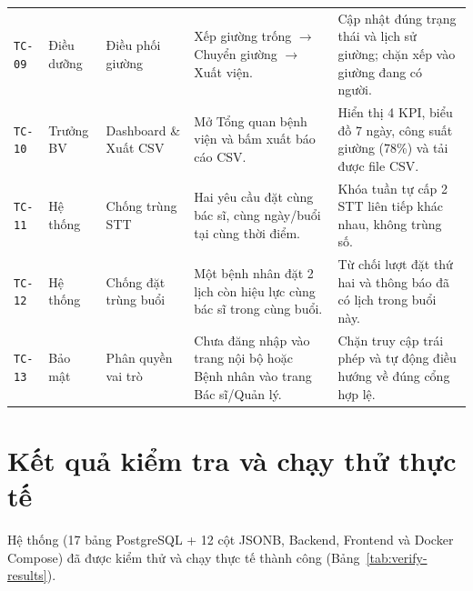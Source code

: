 \documentclass[12pt,a4paper]{report}
\begin{document}
\begin{longtable}{@{}p{1.45cm} p{2.05cm} p{2.85cm} p{3.95cm} p{3.95cm}@{}}
  \texttt{TC-09} & Điều dưỡng & Điều phối giường & Xếp giường trống $\rightarrow$ Chuyển giường $\rightarrow$ Xuất viện. & Cập nhật đúng trạng thái và lịch sử giường; chặn xếp vào giường đang có người. \\
  \texttt{TC-10} & Trưởng BV & Dashboard \& Xuất CSV & Mở Tổng quan bệnh viện và bấm xuất báo cáo CSV. & Hiển thị 4 KPI, biểu đồ 7 ngày, công suất giường (78\%) và tải được file CSV. \\
  \texttt{TC-11} & Hệ thống & Chống trùng STT & Hai yêu cầu đặt cùng bác sĩ, cùng ngày/buổi tại cùng thời điểm. & Khóa tuần tự cấp 2 STT liên tiếp khác nhau, không trùng số. \\
  \texttt{TC-12} & Hệ thống & Chống đặt trùng buổi & Một bệnh nhân đặt 2 lịch còn hiệu lực cùng bác sĩ trong cùng buổi. & Từ chối lượt đặt thứ hai và thông báo đã có lịch trong buổi này. \\
  \texttt{TC-13} & Bảo mật & Phân quyền vai trò & Chưa đăng nhập vào trang nội bộ hoặc Bệnh nhân vào trang Bác sĩ/Quản lý. & Chặn truy cập trái phép và tự động điều hướng về đúng cổng hợp lệ. \\
\end{longtable}

\section{Kết quả kiểm tra và chạy thử thực tế}

Hệ thống (17 bảng PostgreSQL + 12 cột JSONB, Backend, Frontend và Docker Compose) đã được kiểm thử và chạy thực tế thành công (Bảng~\ref{tab:verify-results}).
\end{document}
